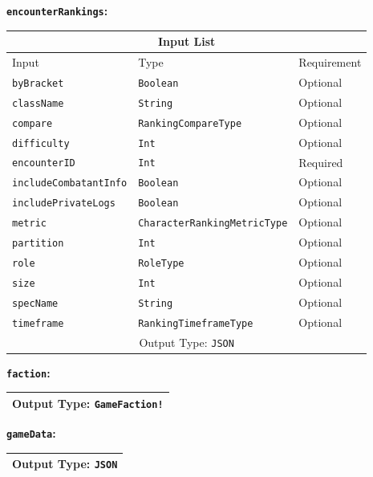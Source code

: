 \documentclass[10pt, a4paper]{memoir}
\numberwithin{equation}{section}
\theoremstyle{plain}
\theoremstyle{defp}
\theoremstyle{dotless}
\theoremstyle{definition}
\theoremstyle{dotless}
\theoremstyle{dotless}
\theoremstyle{defp}
\theoremstyle{defp}
\theoremstyle{be}          %
\theoremstyle{defp}
\newcommand\ttt[1]{\texttt{#1}}
\begin{document}
\medskip

\newpage

\textbf{\ttt{encounterRankings}:}

\begin{table}[h!]
	\centering
	\begin{tabular}{ |p{4.2cm}|p{6cm}|p{3cm}|  }
		\hline
		\multicolumn{3}{|c|}{Input List} \\
		\hline
		Input & Type & Requirement\\
		\hline
		\ttt{byBracket}   & \ttt{Boolean} & Optional\\
		\ttt{className}& \ttt{String} & Optional\\
		\ttt{compare} & \ttt{RankingCompareType} & Optional\\
		\ttt{difficulty} & \ttt{Int} & Optional\\
		\ttt{encounterID} & \ttt{Int} & Required\\
		\ttt{includeCombatantInfo} & \ttt{Boolean} & Optional\\
		\ttt{includePrivateLogs} & \ttt{Boolean} & Optional\\
		\ttt{metric} & \ttt{CharacterRankingMetricType} & Optional\\
		\ttt{partition} & \ttt{Int} & Optional\\
		\ttt{role} & \ttt{RoleType} & Optional\\
		\ttt{size} & \ttt{Int} & Optional\\
		\ttt{specName} & \ttt{String} & Optional\\
		\ttt{timeframe} & \ttt{RankingTimeframeType} & Optional\\
		\hline
		\multicolumn{3}{|c|}{Output Type: \ttt{JSON}} \\
		\hline
	\end{tabular}
\end{table}

\medskip

\textbf{\ttt{faction}:}

\begin{table}[h]
	\centering
	\begin{tabular}{ |p{3cm}|p{3cm}|p{3cm}|  }
		\hline
		\multicolumn{3}{|c|}{Output Type: \ttt{GameFaction!}} \\
		\hline
	\end{tabular}
\end{table}

\medskip

\textbf{\ttt{gameData}:}

\begin{table}[h]
	\centering
	\begin{tabular}{ |p{3cm}|p{3cm}|p{3cm}|  }
		\hline
		\multicolumn{3}{|c|}{Output Type: \ttt{JSON}} \\
		\hline
	\end{tabular}
\end{table}
\end{document}
